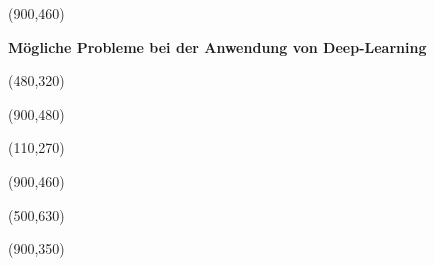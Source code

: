 \documentclass[36pt,extrafontsizes,article,oneside,final]{memoir}
\begin{document}
\begin{minipage}[c][\textheight-50pt][t]{0.50\textwidth}
\begin{center}
\makebox(900,460){
\parbox{900pt}{
\begin{center}
\begin{Spacing}{2}
\textbf{
\huge
Mögliche Probleme bei der Anwendung von Deep-Learning
}
\end{Spacing}
\end{center}
}}

\makebox(480,320){
}

\colorbox{gray!20}{
\makebox(900,480){
\large
{}}}

\makebox(110,270){
}

\colorbox{gray!20}{
\makebox(900,460){
\large
{}}}

\makebox(500,630){
}

\makebox(900,350){
}
\end{center}
\end{minipage}
\end{document}
